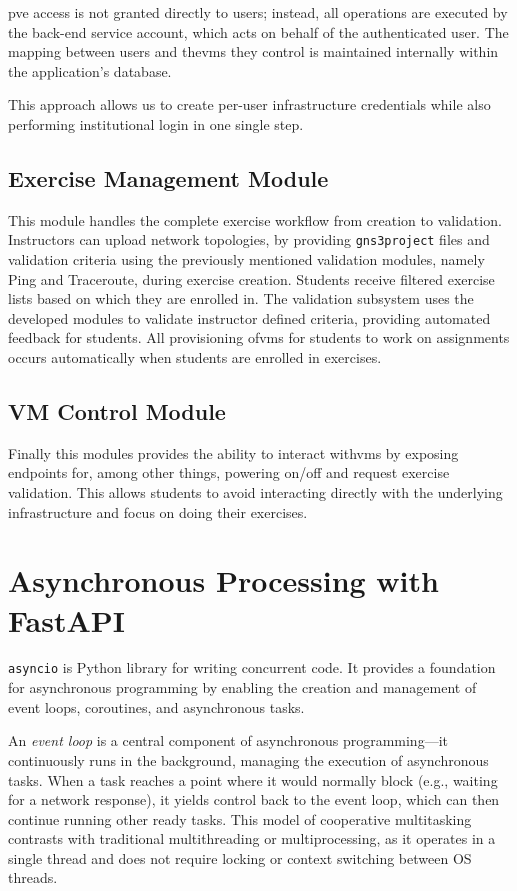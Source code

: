         \ac{pve} access is not granted directly to users; instead, all operations are executed by the back-end 
        service account, which acts on behalf of the authenticated user. The mapping between users and the\ac{vm}s they 
        control is maintained internally within the application's database.

        This approach allows us to create per-user infrastructure credentials while also performing institutional login 
        in one single step.

    \subsection{Exercise Management Module}
        This module handles the complete exercise workflow from creation to validation. Instructors can upload 
        network topologies, by providing \texttt{gns3project} files and validation criteria using the previously mentioned 
        validation modules, namely Ping and Traceroute, during exercise creation. Students receive filtered 
        exercise lists based on which they are enrolled in. The validation subsystem uses the developed modules 
        to validate instructor defined criteria, providing automated feedback for students. All provisioning of\ac{vm}s for 
        students to work on assignments occurs automatically when students are enrolled in exercises.

    \subsection{VM Control Module}
        Finally this modules provides the ability to interact with\ac{vm}s by exposing endpoints for, among other 
        things, powering on/off and request exercise validation. This allows students to avoid interacting directly with 
        the underlying infrastructure and focus on doing their exercises.

\section{Asynchronous Processing with FastAPI}
    \texttt{asyncio} is Python library for writing concurrent code. It provides a foundation for asynchronous programming by enabling 
    the creation and management of event loops, coroutines, and asynchronous tasks.

    An \textit{event loop} is a central component of asynchronous programming—it continuously runs in the background, managing 
    the execution of asynchronous tasks. When a task reaches a point where it would normally block (e.g., waiting for a network 
    response), it yields control back to the event loop, which can then continue running other ready tasks. This model of 
    cooperative multitasking contrasts with traditional multithreading or multiprocessing, as it operates in a single thread 
    and does not require locking or context switching between OS threads.

